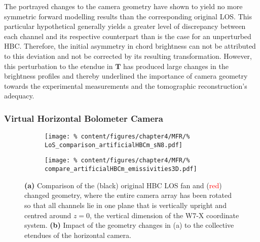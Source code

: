             The portrayed changes to the camera geometry have shown to yield no more symmetric forward modelling results than the corresponding original LOS. This particular hypothetical generally yields a greater level of discrepancy between each channel and its respective counterpart than is the case for an unperturbed HBC. Therefore, the initial asymmetry in chord brightness can not be attributed to this deviation and not be corrected by its resulting transformation. However, this perturbation to the etendue in $\mathbf{T}$ has produced large changes in the brightness profiles and thereby underlined the importance of camera geometry towards the experimental measurements and the tomographic reconstruction's adequacy.%
%
        \subsubsection*{Virtual Horizontal Bolometer Camera}%
%
            \begin{figure}[t]%
                \centering%
                \begin{subfigure}{0.4\textwidth}%
                    \texttt{[image: \%
                        content/figures/chapter4/MFR/\%
                        LoS\_comparison\_artificialHBCm\_sN8.pdf]}%
                    \caption{}%
                \end{subfigure}%
                \hfill%
                \begin{subfigure}{0.55\textwidth}%
                    \texttt{[image: \%
                        content/figures/chapter4/MFR/\%
                        compare\_artificialHBCm\_emissivities3D.pdf]}%
                    \caption{}%
                \end{subfigure}%
                \caption{\textbf{(a)} Comparison of the (black) original HBC LOS fan and (\textcolor{red}{red}) changed geometry, where the entire camera array has been rotated so that all channels lie in one plane that is vertically upright and centred around $z=0$, the vertical dimension of the W7-X coordinate system. \textbf{(b)} Impact of the geometry changes in (a) to the collective etendues of the horizontal camera.}\label{fig:geometry_change_artificial}%
            \end{figure}%
%
